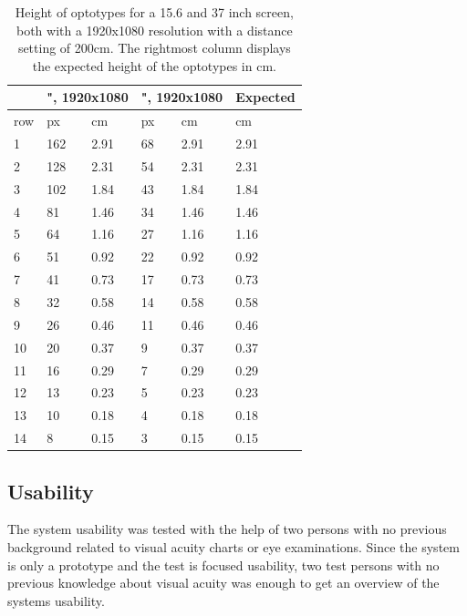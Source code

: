 \documentclass[12pt,a4paper,notitlepage]{report}
\begin{document}
\begin{table}[ht!]
\centering
\begin{tabular}{ p{1cm}|p{1cm}p{1cm}|p{1cm}p{1cm}|p{1cm} }
	 &	\multicolumn{2}{c}{\parbox{2cm}{", 1920x1080}} & \multicolumn{2}{c}{\parbox{2cm}{", 1920x1080}}	& 	Expected	\\
\hline
	 row  & px & cm & px & cm & cm \\
\hline\hline				
								1	&	162	&	2.91	&	68	&	2.91	&	2.91\\	
								2	&	128 & 	2.31	& 	54	&	2.31	&	2.31\\
		 						3	&	102 & 	1.84	& 	43	&	1.84	&	1.84\\
								4	&	81 	& 	1.46	& 	34	&	1.46	&	1.46\\
								5	&	64 	& 	1.16	& 	27	&	1.16	&	1.16\\
								6	&	51 	& 	0.92	& 	22	&	0.92	&	0.92\\
								7	&	41 	& 	0.73	& 	17	&	0.73	&	0.73\\
								8	&	32 	& 	0.58	& 	14	&	0.58	&	0.58\\
								9	&	26 	& 	0.46	& 	11	&	0.46	&	0.46\\
								10	&	20 	& 	0.37	& 	9	&	0.37	&	0.37\\
								11	&	16 	& 	0.29	& 	7	&	0.29	&	0.29\\
								12	&	13 	& 	0.23	& 	5	&	0.23	&	0.23\\
								13	&	10 	& 	0.18	& 	4	&	0.18	&	0.18\\
								14	&	8 	& 	0.15	& 	3	&	0.15	&	0.15\\
										\hline
\end{tabular}
\caption{Height of optotypes for a 15.6 and 37 inch screen, both with a 1920x1080 resolution with a distance setting of 200cm. The rightmost column displays the expected height of the optotypes in cm.} \label{tab:optotype_test}
\end{table}


\subsection{Usability}
The system usability was tested with the help of two persons with no previous background related to visual acuity charts or eye examinations. Since the system is only a prototype and the test is focused  usability, two test persons with no previous knowledge about visual acuity was enough to get an overview of the systems usability.
\end{document}
